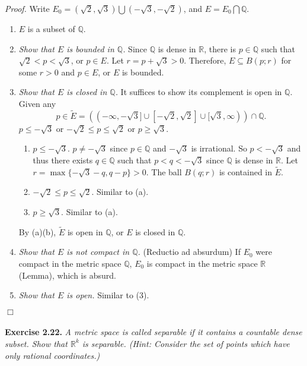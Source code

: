 \documentclass{article}
\begin{document}
\emph{Proof.}
Write $E_0 = (\sqrt{2},\sqrt{3}) \bigcup (-\sqrt{3},-\sqrt{2})$,
and $E = E_0 \bigcap \mathbb{Q}$.
\begin{enumerate}
\item[(1)]
$E$ is a subset of $\mathbb{Q}$.
\item[(2)]
\emph{Show that $E$ is bounded in $\mathbb{Q}$.}
Since $\mathbb{Q}$ is dense in $\mathbb{R}$,
there is $p \in \mathbb{Q}$ such that $\sqrt{2} < p < \sqrt{3}$, or $p \in E$.
Let $r = p + \sqrt{3} > 0$.
Therefore, $E \subseteq B(p;r)$ for some $r > 0$ and $p \in E$,
or $E$ is bounded.
\item[(3)]
\emph{Show that $E$ is closed in $\mathbb{Q}$.}
It suffices to show its complement is open in $\mathbb{Q}$.
Given any
$$p \in \widetilde{E}
= ((-\infty, -\sqrt{3}] \cup [-\sqrt{2},\sqrt{2}] \cup [\sqrt{3}, \infty)) \cap \mathbb{Q}.$$
$p \leq -\sqrt{3}$ or $-\sqrt{2} \leq p \leq \sqrt{2}$ or $p \geq \sqrt{3}$.
  \begin{enumerate}
  \item[(a)]
  $p \leq -\sqrt{3}$. $p \neq -\sqrt{3}$ since $p \in \mathbb{Q}$ and $-\sqrt{3}$ is irrational.
  So $p < -\sqrt{3}$ and thus there exists $q \in \mathbb{Q}$ such that $p < q < -\sqrt{3}$
  since $\mathbb{Q}$ is dense in $\mathbb{R}$.
  Let $r = \max\{-\sqrt{3} - q, q - p\} > 0$.
  The ball $B(q;r)$ is contained in $\widetilde{E}$.
  \item[(b)]
  $-\sqrt{2} \leq p \leq \sqrt{2}$. Similar to (a).
  \item[(c)]
  $p \geq \sqrt{3}$. Similar to (a).
  \end{enumerate}
  By (a)(b), $\widetilde{E}$ is open in $\mathbb{Q}$, or $E$ is closed in $\mathbb{Q}$.
\item[(4)]
\emph{Show that $E$ is not compact in $\mathbb{Q}$.}
(Reductio ad absurdum)
If $E_0$ were compact in the metric space $\mathbb{Q}$,
$E_0$ is compact in the metric space $\mathbb{R}$ (Lemma),
which is absurd.
\item[(5)]
\emph{Show that $E$ is open.}
Similar to (3).
\end{enumerate}
$\Box$ \\\\






\textbf{Exercise 2.22.}
\emph{A metric space is called separable if it contains a countable dense subset.
Show that $\mathbb{R}^k$ is separable.
(Hint: Consider the set of points which have only rational coordinates.)} \\
\end{document}
